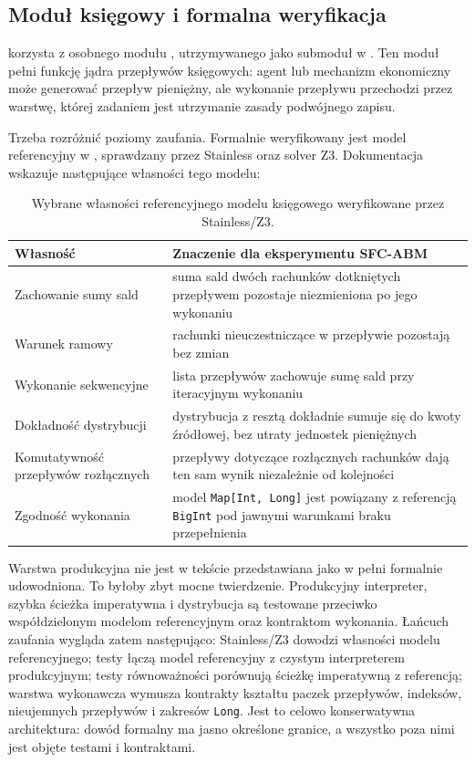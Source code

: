 \subsection{Moduł księgowy i formalna weryfikacja}

\amor{} korzysta z osobnego modułu \ledger{}, utrzymywanego jako submoduł w . Ten moduł pełni funkcję jądra przepływów księgowych: agent lub mechanizm ekonomiczny może generować przepływ pieniężny, ale wykonanie przepływu przechodzi przez warstwę, której zadaniem jest utrzymanie zasady podwójnego zapisu.

Trzeba rozróżnić poziomy zaufania. Formalnie weryfikowany jest model referencyjny w , sprawdzany przez Stainless oraz solver Z3. Dokumentacja  wskazuje następujące własności tego modelu:

\begin{table}[H]
\centering
\scriptsize
\begin{tabularx}{\textwidth}{@{}L{0.30\textwidth}X@{}}
\toprule
\textbf{Własność} & \textbf{Znaczenie dla eksperymentu SFC-ABM} \\
\midrule
Zachowanie sumy sald & suma sald dwóch rachunków dotkniętych przepływem pozostaje niezmieniona po jego wykonaniu \\
Warunek ramowy & rachunki nieuczestniczące w przepływie pozostają bez zmian \\
Wykonanie sekwencyjne & lista przepływów zachowuje sumę sald przy iteracyjnym wykonaniu \\
Dokładność dystrybucji & dystrybucja z resztą dokładnie sumuje się do kwoty źródłowej, bez utraty jednostek pieniężnych \\
Komutatywność przepływów rozłącznych & przepływy dotyczące rozłącznych rachunków dają ten sam wynik niezależnie od kolejności \\
Zgodność wykonania & model \texttt{Map[Int, Long]} jest powiązany z referencją \texttt{BigInt} pod jawnymi warunkami braku przepełnienia \\
\bottomrule
\end{tabularx}
\caption{Wybrane własności referencyjnego modelu księgowego weryfikowane przez \mbox{Stainless/Z3}.}
\label{tab:ledger-verification}
\end{table}

Warstwa produkcyjna nie jest w tekście przedstawiana jako w pełni formalnie udowodniona. To byłoby zbyt mocne twierdzenie. Produkcyjny interpreter, szybka ścieżka imperatywna i dystrybucja są testowane przeciwko współdzielonym modelom referencyjnym oraz kontraktom wykonania. Łańcuch zaufania wygląda zatem następująco: Stainless/Z3 dowodzi własności modelu referencyjnego; testy łączą model referencyjny z czystym interpreterem produkcyjnym; testy równoważności porównują ścieżkę imperatywną z referencją; warstwa wykonawcza wymusza kontrakty kształtu paczek przepływów, indeksów, nieujemnych przepływów i zakresów \texttt{Long}. Jest to celowo konserwatywna architektura: dowód formalny ma jasno określone granice, a wszystko poza nimi jest objęte testami i kontraktami.

